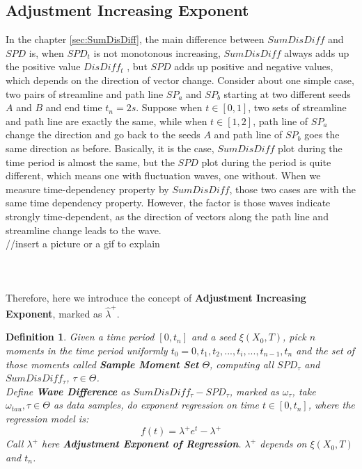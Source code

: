 \documentclass[
     11pt,         %
     a4paper,      %
     oneside,
     ]{article}
\newtheorem{mydef}{Definition}
\begin{document}
\subsection{Adjustment Increasing Exponent}
In the chapter \ref{sec:SumDisDiff}, the main difference between $SumDisDiff$ and $SPD$ is, when $SPD_{t}$ is not monotonous increasing, $SumDisDiff$ always adds up the positive value $DisDiff_{t}$ , but $SPD$ adds up positive and negative values, which depends on the direction of vector change. Consider about one simple case, two pairs of streamline and path line $SP_{a}$ and $SP_{b}$ starting at two different seeds $A$ and $B$ and end time $t_{n}=2s$. Suppose when $t\in[0,1]$, two sets of streamline and path line are exactly the same, while when $t\in[1,2]$, path line of $SP_{a}$ change the direction and go back to the seeds $A$  and path line of $SP_{b}$ goes the same direction as before. Basically, it is the case, $SumDisDiff$ plot during the time period is almost the same, but the $SPD$ plot during the period is quite different, which means one with fluctuation waves, one without. When we measure time-dependency property by $SumDisDiff$, those two cases are with the same time dependency property. However, the factor is those waves indicate strongly time-dependent, as the direction of vectors along the path line and streamline change leads to the wave.\\
//insert a picture or a gif to explain\\
\\
\\
\\
Therefore, here we introduce the concept of \textbf{Adjustment Increasing Exponent}, marked as $\hat{\lambda}^{+}$.
\begin{mydef}\label{Def:WaveDiff}
Given a time period $[0,t_{n}]$ and a seed $\xi(X_{0},T)$, pick $n$ moments in the time period uniformly $t_{0}=0,t_{1},t_{2},...,t_{i},...,t_{n-1},t_{n}$ and the set of those moments called \textbf{Sample Moment Set} $\Theta$, computing all $SPD_{\tau}$ and $SumDisDiff_{\tau}$, $\tau\in\Theta$.\\ 
Define \textbf{Wave Difference} as $SumDisDiff_{\tau}-SPD_{\tau}$, marked as $\omega_{\tau}$, take $\omega_{tau},\tau\in\Theta$  as data samples, do exponent regression on time $t\in[0, t_{n}]$, where the regression model is:
		$$f(t)=\lambda^{+} e^{t}-\lambda^{+}$$
Call $\lambda^{+}$ here \textbf{Adjustment Exponent of Regression}.  $\lambda^{+}$ depends on $\xi(X_{0},T)$ and $t_{n}$.
\end{mydef}
\end{document}
